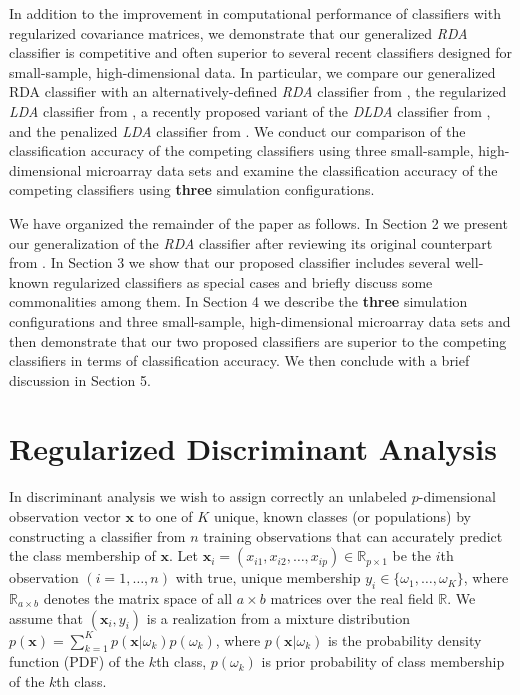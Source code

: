 \documentclass[11pt]{article}
\begin{document}
In addition to the improvement in computational performance of classifiers with regularized covariance matrices, we demonstrate that our generalized \emph{RDA} classifier is competitive and often superior to several recent classifiers designed for small-sample, high-dimensional data. In particular, we compare our generalized RDA classifier with an alternatively-defined \emph{RDA} classifier from \cite*{Hastie:2008dt}, the regularized \emph{LDA} classifier from \cite{Guo:2007te}, a recently proposed variant of the \emph{DLDA} classifier from \cite*{Tong:2012hw}, and the penalized \emph{LDA} classifier from \cite{Witten:2011kc}. We conduct our comparison of the classification accuracy of the competing classifiers using three small-sample, high-dimensional microarray data sets and examine the classification accuracy of the competing classifiers using \textbf{three} simulation configurations.

We have organized the remainder of the paper as follows. In Section 2 we present our generalization of the \emph{RDA} classifier after reviewing its original counterpart from \cite{Friedman:1989tm}. In Section 3 we show that our proposed classifier includes several well-known regularized classifiers as special cases and briefly discuss some commonalities among them. In Section 4 we describe the \textbf{three} simulation configurations and three small-sample, high-dimensional microarray data sets and then demonstrate that our two proposed classifiers are superior to the competing classifiers in terms of classification accuracy. We then conclude with a brief discussion in Section 5.

\section{Regularized Discriminant Analysis}
\label{sec:rda}

In discriminant analysis we wish to assign correctly an unlabeled $p$-dimensional observation vector $\bm x$ to one of $K$ unique, known classes (or populations) by constructing a classifier from $n$ training observations that can accurately predict the class membership of $\bm x$. Let $\bm x_i = (x_{i1}, x_{i2}, \ldots, x_{ip}) \in \mathbb{R}_{p \times 1}$ be the $i$th observation $(i = 1, \ldots, n)$ with true, unique membership $y_i \in \{\omega_1, \ldots, \omega_K\}$, where $\mathbb{R}_{a \times b}$ denotes the matrix space of all $a \times b$ matrices over the real field $\mathbb{R}$. We assume that $(\bm x_i, y_i)$ is a realization from a mixture distribution $p(\bm x) = \sum_{k=1}^K p(\bm x | \omega_k) p(\omega_k)$, where $p(\bm x | \omega_k)$ is the probability density function (PDF) of the $k$th class, $p(\omega_k)$ is prior probability of class membership of the $k$th class.
\end{document}
